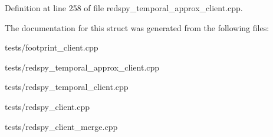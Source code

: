 Definition at line 258 of file redspy\-\_\-temporal\-\_\-approx\-\_\-client.\-cpp.



The documentation for this struct was generated from the following files\-:\begin{DoxyCompactItemize}
\item 
tests/footprint\-\_\-client.\-cpp\item 
tests/redspy\-\_\-temporal\-\_\-approx\-\_\-client.\-cpp\item 
tests/redspy\-\_\-temporal\-\_\-client.\-cpp\item 
tests/redspy\-\_\-client.\-cpp\item 
tests/redspy\-\_\-client\-\_\-merge.\-cpp\end{DoxyCompactItemize}
